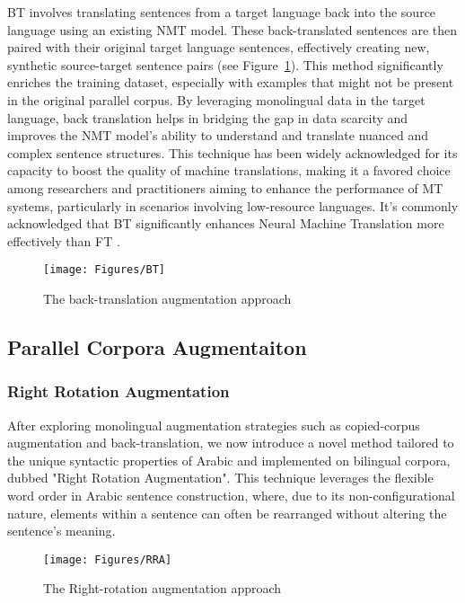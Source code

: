 BT involves translating sentences from a target language back into the source language using an existing NMT model. 
These back-translated sentences are then paired with their original target language sentences, effectively creating new, synthetic source-target sentence pairs (see Figure~\ref{fig:bt}). 
This method significantly enriches the training dataset, especially with examples that might not be present in the original parallel corpus. 
By leveraging monolingual data in the target language, back translation helps in bridging the gap in data scarcity and improves the NMT model's ability to understand and translate nuanced and complex sentence structures. 
This technique has been widely acknowledged for its capacity to boost the quality of machine translations, making it a favored choice among researchers and practitioners aiming to enhance the performance of MT systems, particularly in scenarios involving low-resource languages.
It's commonly acknowledged that BT significantly enhances Neural Machine Translation more effectively than FT \cite{bogoychev19}.

\begin{figure}[ht]
	\centering
	\texttt{[image: Figures/BT]}
	\caption{The back-translation augmentation approach}
	\label{fig:bt}
\end{figure}

\subsection{Parallel Corpora Augmentaiton}
\subsubsection{Right Rotation Augmentation}
After exploring monolingual augmentation strategies such as copied-corpus augmentation and back-translation, we now introduce a novel method tailored to the unique syntactic properties of Arabic and implemented on bilingual corpora, dubbed "Right Rotation Augmentation". 
This technique leverages the flexible word order in Arabic sentence construction, where, due to its non-configurational nature, elements within a sentence can often be rearranged without altering the sentence's meaning. 

\begin{figure}[h]
	\centering
	\texttt{[image: Figures/RRA]}
	\caption{The Right-rotation augmentation approach}
	\label{fig:rra}
\end{figure}

